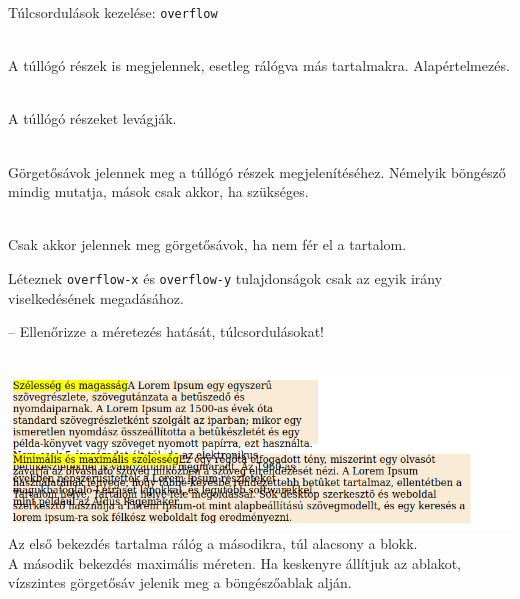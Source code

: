 \begin{frame}
  Túlcsordulások kezelése: \texttt{overflow}
  \begin{description}[m]
    \item[\texttt{visible}] \hfill \\ A túllógó részek is megjelennek, esetleg rálógva más tartalmakra. Alapértelmezés.
    \item[\texttt{hidden}] \hfill \\ A túllógó részeket levágják.
    \item[\texttt{scroll}] \hfill \\ Görgetősávok jelennek meg a túllógó részek megjelenítéséhez. Némelyik böngésző mindig mutatja, mások csak akkor, ha szükséges.
    \item[\texttt{auto}] \hfill \\ Csak akkor jelennek meg görgetősávok, ha nem fér el a tartalom.
  \end{description}
  \vfill
  Léteznek \texttt{overflow-x} és \texttt{overflow-y} tulajdonságok csak az egyik irány viselkedésének megadásához.
\end{frame}

\begin{frame}
  \begin{exampleblock}{ -- Ellenőrizze a méretezés hatását, túlcsordulásokat!}
    \scriptsize
    
    
  \end{exampleblock}
  \begin{columns}[T]
      \includegraphics[width=\textwidth]{tulnyulas.png}
      Az első bekezdés tartalma rálóg a másodikra, túl alacsony a blokk.\\
      A második bekezdés maximális méreten. Ha keskenyre állítjuk az ablakot, vízszintes görgetősáv jelenik meg a böngészőablak alján.
  \end{columns}
\end{frame}
